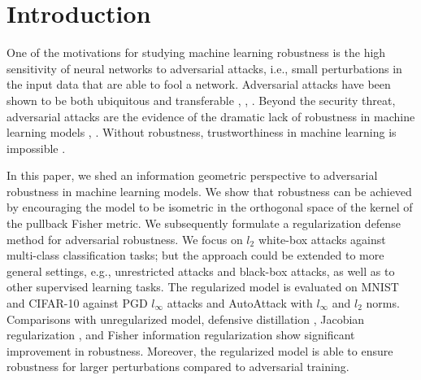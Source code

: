 \documentclass[entropy,article,submit,pdftex,moreauthors]{Definitions/mdpi}
\theoremstyle{plain}
\theoremstyle{definition}
\begin{document}
%
\maketitle
%
%
%
\section{Introduction}
\label{sec:intro}

One of the motivations for studying machine learning robustness
 is the high sensitivity of neural networks to adversarial attacks, i.e., small perturbations 
 in the input data that are able to fool a network. Adversarial attacks have been shown to be both 
 ubiquitous and transferable \citep{szegedyIntriguingPropertiesNeural2014},
  \citep{goodfellowExplainingHarnessingAdversarial2015}, \citep{DBLP:conf/iclr/MadryMSTV18}. 
  Beyond the security threat, adversarial attacks are the evidence of the dramatic lack of robustness
   in machine learning models \citep{carliniEvaluatingRobustnessNeural2017}, \citep{Gilmer2018}.
    Without robustness, trustworthiness in machine learning is impossible \citep{liTrustworthyAIPrinciples2023}.


In this paper, we shed an information geometric perspective to adversarial robustness in machine learning models. We show that robustness can be achieved by encouraging the model to be isometric in the orthogonal space of the kernel of the pullback Fisher metric. We subsequently formulate a regularization defense method for adversarial robustness. We focus on $l_2$ white-box attacks against multi-class classification tasks; but the approach could be extended to more general settings, e.g., unrestricted attacks and black-box attacks, as well as to other supervised learning tasks. The regularized model is evaluated on MNIST and CIFAR-10 against PGD $l_\infty$ attacks and AutoAttack \citep{croceReliableEvaluationAdversarial2020} with $l_\infty$ and $l_2$ norms. Comparisons with unregularized model, defensive distillation \citep{papernotDistillationDefenseAdversarial2016}, Jacobian regularization \citep{hoffmanRobustLearningJacobian2019}, and Fisher information regularization \citep{shenDefendingAdversarialAttacks2019} show significant improvement in robustness. Moreover, the regularized model is able to ensure robustness for larger perturbations compared to adversarial training.
\end{document}
